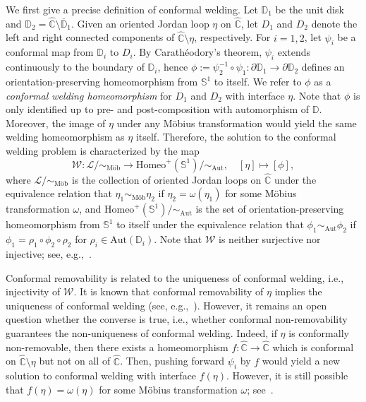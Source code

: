 \documentclass[a4paper]{article}
\numberwithin{equation}{section}
\numberwithin{equation}{section}
\renewcommand{\1}{\mathbf{1}}
\begin{document}
We first give a precise definition of conformal welding. Let $\mathbb D_1$ be the unit disk and $\mathbb D_2 = \widehat{\mathbb C} \setminus \overline{\mathbb D}_1$. Given an oriented Jordan loop $\eta$ on $\widehat{\mathbb C}$, let $D_1$ and $D_2$ denote the left and right connected components of $\widehat{\mathbb C} \setminus \eta$, respectively. For $i=1,2$, let $\psi_i$ be a conformal map from $\mathbb D_i$ to $D_i$. By Carath\'eodory's theorem, $\psi_i$ extends continuously to the boundary of $\mathbb D_i$, hence $\phi:=\psi_2^{-1} \circ \psi_1:\partial \mathbb D_1 \to \partial \mathbb D_2$ defines an orientation-preserving homeomorphism from $\mathbb S^1$ to itself. We refer to $\phi$ as a \emph{conformal welding homeomorphism} for $D_1$ and $D_2$ with interface $\eta$. Note that $\phi$ is only identified up to pre- and post-composition with automorphism of $\mathbb D$. Moreover, the image of $\eta$ under any M\"obius transformation would yield the same welding homeomorphism as $\eta$ itself. Therefore, the solution to the conformal welding problem is characterized by the map
\[ \mathcal W: \mathcal L/{\sim_{\text{M\"ob}}} \to \mathrm{Homeo}^+(\mathbb S^1)/{\sim_{\mathrm{Aut}}}, \quad [\eta] \mapsto [\phi], \]
where $\mathcal L/{\sim_{\text{M\"ob}}}$ is the collection of oriented Jordan loops on $\widehat{\mathbb C}$ under the equivalence relation that $\eta_1 \sim_{\text{M\"ob}} \eta_2$ if $\eta_2=\omega(\eta_1)$ for some M\"obius transformation $\omega$, and $\mathrm{Homeo}^+(\mathbb S^1)/{\sim_{\mathrm{Aut}}}$ is the set of orientation-preserving homeomorphism from $\mathbb S^1$ to itself under the equivalence relation that $\phi_1 \sim_{\mathrm{Aut}} \phi_2$ if $\phi_1=\rho_1 \circ \phi_2 \circ \rho_2$ for $\rho_i \in \mathrm{Aut}(\mathbb D_i)$. Note that $\mathcal{W}$ is neither surjective nor injective; see, e.g.,~\cite{Bishop-welding}.

Conformal removability is related to the uniqueness of conformal welding, i.e., injectivity of $\mathcal W$. It is known that conformal removability of $\eta$ implies the uniqueness of conformal welding (see, e.g.,~\cite[Corollary 5.24]{Younsi-survey}). However, it remains an open question whether the converse is true, i.e., whether conformal non-removability guarantees the non-uniqueness of conformal welding. Indeed, if $\eta$ is conformally non-removable, then there exists a homeomorphism $f:\widehat{\mathbb C} \to \widehat{\mathbb C}$ which is conformal on $\widehat{\mathbb C} \setminus \eta$ but not on all of $\widehat{\mathbb C}$. Then, pushing forward $\psi_i$ by $f$ would yield a new solution to conformal welding with interface $f(\eta)$. However, it is still possible that $f(\eta)=\omega(\eta)$ for some M\"obius transformation $\omega$; see~\cite{younsi-counterexample}.
\end{document}
